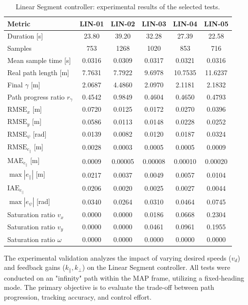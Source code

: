   \begin{table}[H]
  \centering
  \caption{Linear Segment controller: experimental results of the selected tests.}
  \label{tab:linear_experimental_results}
  \small
  \begin{tabular}{lccccc}
  \toprule
  \textbf{Metric} &
  \textbf{LIN-01} &
  \textbf{LIN-02} &
  \textbf{LIN-03} &
  \textbf{LIN-04} &
  \textbf{LIN-05} \\
  \midrule
  Duration [s] & 23.80 & 39.20 & 32.28 & 27.39 & 22.58 \\
  Samples & 753 & 1268 & 1020 & 853 & 716 \\
  Mean sample time [s] & 0.0316 & 0.0309 & 0.0317 & 0.0321 & 0.0316 \\
  Real path length [m] & 7.7631 & 7.7922 & 9.6978 & 10.7535 & 11.6237 \\
  Final \(\gamma\) [m] & 2.0687 & 4.4860 & 2.0970 & 2.1181 & 2.1832 \\
  Path progress ratio \(r_{\gamma}\) & 0.4542 & 0.9849 & 0.4604 & 0.4650 & 0.4793 \\
  \(\mathrm{RMSE}_x\) [m] & 0.0720 & 0.0125 & 0.0172 & 0.0270 & 0.0396 \\
  \(\mathrm{RMSE}_y\) [m] & 0.0586 & 0.0113 & 0.0148 & 0.0228 & 0.0252 \\
  \(\mathrm{RMSE}_{\psi}\) [rad] & 0.0139 & 0.0082 & 0.0120 & 0.0187 & 0.0324 \\
  \(\mathrm{RMSE}_{e_{\parallel}}\) [m] & 0.0028 & 0.0003 & 0.0005 & 0.0005 & 0.0009 \\
  \(\mathrm{MAE}_{e_{\parallel}}\) [m] & 0.0009 & 0.00005 & 0.00008 & 0.00010 & 0.00020 \\
  \(\max |e_{\parallel}|\) [m] & 0.0217 & 0.0037 & 0.0049 & 0.0057 & 0.0104 \\
  \(\mathrm{IAE}_{e_{\parallel}}\) & 0.0206 & 0.0020 & 0.0025 & 0.0027 & 0.0044 \\
  \(\max |e_{\psi}|\) [rad] & 0.0340 & 0.0264 & 0.0310 & 0.0464 & 0.0745 \\
  Saturation ratio \(v_x\) & 0.0000 & 0.0000 & 0.0186 & 0.0668 & 0.2304 \\
  Saturation ratio \(v_y\) & 0.0000 & 0.0000 & 0.0461 & 0.0961 & 0.1955 \\
  Saturation ratio \(\omega\) & 0.0000 & 0.0000 & 0.0000 & 0.0000 & 0.0000 \\
  \bottomrule
  \end{tabular}
  \end{table}

 The experimental validation analyzes the impact of varying desired speeds ($v_d$) and feedback gains ($k_{\parallel}, k_{\perp}$) on the Linear Segment controller. All tests were conducted on an "infinity" path within the MAP frame, utilizing a fixed-heading mode. The primary objective is to evaluate the trade-off between path progression, tracking accuracy, and control effort.

